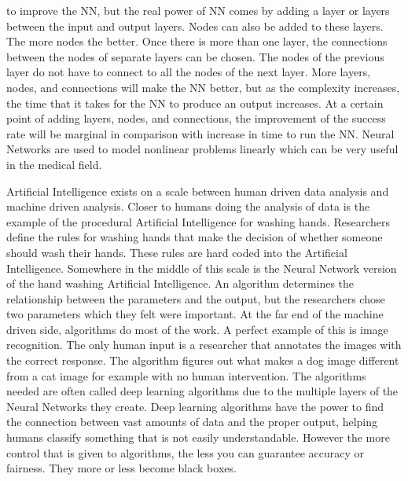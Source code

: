 \documentclass[]{article}
\begin{document}
to improve the NN, but the real power of NN comes by adding a layer or layers between the input and output layers. Nodes can also be added to these layers. The more nodes the better. Once there is more than one layer, the connections between the nodes of separate layers can be chosen. The nodes of the previous layer do not have to connect to all the nodes of the next layer. More layers, nodes, and connections will make the NN better, but as the complexity increases, the time that it takes for the NN to produce an output increases. At a certain point of adding layers, nodes, and connections, the improvement of the success rate will be marginal in comparison with increase in time to run the NN. Neural Networks are used to model nonlinear problems linearly which can be very useful in the medical field.\cite{introtoneuralnets}
			
			Artificial Intelligence exists on a scale between human driven data analysis and machine driven analysis. Closer to humans doing the analysis of data is the example of the procedural Artificial Intelligence for washing hands. Researchers define the rules for washing hands that make the decision of whether someone should wash their hands. These rules are hard coded into the Artificial Intelligence. Somewhere in the middle of this scale is the Neural Network version of the hand washing Artificial Intelligence. An algorithm determines the relationship between the parameters and the output, but the researchers chose two parameters which they felt were important. At the far end of the machine driven side, algorithms do most of the work. A perfect example of this is image recognition. The only human input is a researcher that annotates the images with the correct response. The algorithm figures out what makes a dog image different from a cat image for example with no human intervention. The algorithms needed are often called deep learning algorithms due to the multiple layers of the Neural Networks they create. Deep learning algorithms have the power to find the connection between vast amounts of data and the proper output, helping humans classify something that is not easily understandable. However the more control that is given to algorithms, the less you can guarantee accuracy or fairness. They more or less become black boxes.\cite{beam2018big}
			
\end{document}
